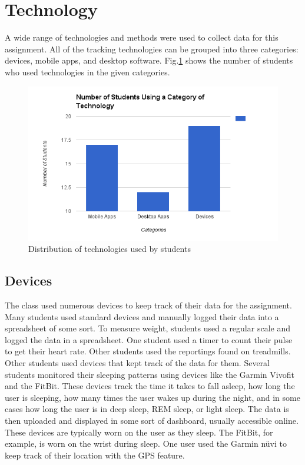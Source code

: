 \section{Technology}
A wide range of technologies and methods were used to collect data for this assignment. All of the tracking technologies can be grouped into three categories: devices, mobile apps, and desktop software. Fig.\ref{fig:technology} shows the number of students who used technologies in the given categories. 

\begin{figure}[!t]\centering
	\includegraphics[width=1.0\columnwidth]{images/technology_chart.png}
	\caption{\footnotesize Distribution of technologies used by students\label{fig:technology} 
	}%
\end{figure}
%

\subsection{Devices}
    The class used numerous devices to keep track of their data for the assignment. Many students used standard devices and manually logged their data into a spreadsheet of some sort. To measure weight, students used a regular scale and logged the data in a spreadsheet. One student used a timer to count their pulse to get their heart rate. Other students used the reportings found on treadmills. 
    Other students used devices that kept track of the data for them. Several students monitored their sleeping patterns using devices like the Garmin Vivofit and the FitBit. These devices track the time it takes to fall asleep, how long the user is sleeping, how many times the user wakes up during the night, and in some cases how long the user is in deep sleep, REM sleep, or light sleep. The data is then uploaded and displayed in some sort of dashboard, usually accessible online. These devices are typically worn on the user as they sleep. The FitBit, for example, is worn on the wrist during sleep. One user used the Garmin  nüvi to keep track of their location with the GPS feature. 

